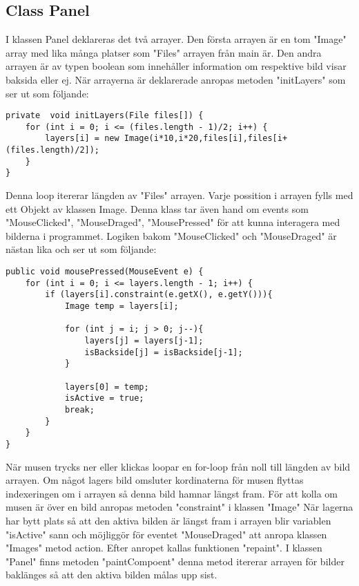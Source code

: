 \documentclass[hidelinks]{article}
\begin{document}
\subsection*{Class Panel}
I klassen Panel deklareras det två arrayer. Den första arrayen är en tom "Image" array med lika många platser som "Files" arrayen från main är.
Den andra arrayen är av typen boolean som innehåller information om respektive bild visar baksida eller ej.
När arrayerna är deklarerade anropas metoden "initLayers" som ser ut som följande:
\begin{verbatim}
private  void initLayers(File files[]) {
    for (int i = 0; i <= (files.length - 1)/2; i++) {
        layers[i] = new Image(i*10,i*20,files[i],files[i+(files.length)/2]);
    }
}    
\end{verbatim}
Denna loop itererar längden av "Files" arrayen. Varje possition i arrayen fylls med ett Objekt av klassen Image. 
Denna klass tar även hand om events som "MouseClicked", "MouseDraged", "MousePressed" för att kunna interagera med bilderna i programmet.
Logiken bakom "MouseClicked" och "MouseDraged" är nästan lika och ser ut som följande:
\begin{verbatim}
public void mousePressed(MouseEvent e) {
    for (int i = 0; i <= layers.length - 1; i++) {
        if (layers[i].constraint(e.getX(), e.getY())){
            Image temp = layers[i];
            
            for (int j = i; j > 0; j--){
                layers[j] = layers[j-1];
                isBackside[j] = isBackside[j-1];
            }
            
            layers[0] = temp;
            isActive = true;
            break;
        } 
    }
}
\end{verbatim}
När musen trycks ner eller klickas loopar en for-loop från noll till längden av bild arrayen.
Om något lagers bild omsluter kordinaterna för musen flyttas indexeringen om i arrayen så denna bild hamnar längst fram.
För att kolla om musen är över en bild anropas metoden "constraint" i klassen "Image"
När lagerna har bytt plats så att den aktiva bilden är längst fram i arrayen blir variablen "isActive" sann och 
möjliggör för eventet "MouseDraged" att anropa klassen "Images" metod action. Efter anropet kallas funktionen "repaint".
I klassen "Panel" finns metoden "paintCompoent" denna metod itererar arrayen för bilder baklänges så att den aktiva bilden målas upp sist.
\end{document}
